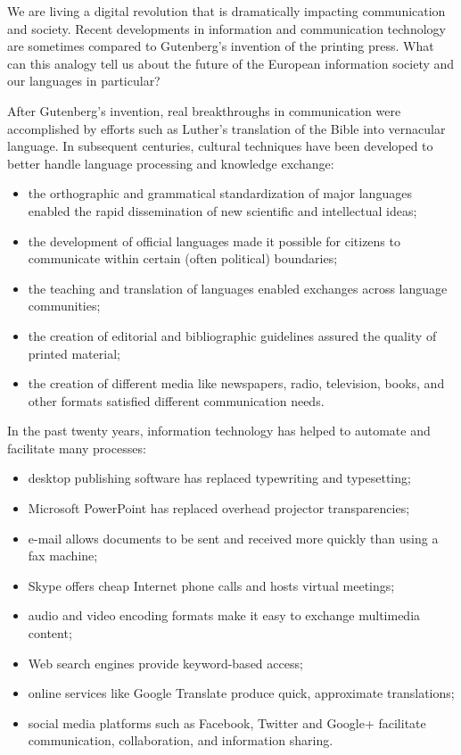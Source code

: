 \begin{multicols}{2}

We are living a digital revolution that is dramatically impacting communication and society. Recent developments in information and communication technology are sometimes compared to Gutenberg's invention of the printing press. What can this analogy tell us about the future of the European information society and our languages in particular?


After Gutenberg's invention, real breakthroughs in communication were accomplished by efforts such as Luther's translation of the Bible into vernacular language. In subsequent centuries, cultural techniques have been developed to better handle language processing and knowledge exchange:

\begin{itemize}
\item the orthographic and grammatical standardization of major languages enabled the rapid dissemination of new scientific and intellectual ideas;
\item the development of official languages made it possible for citizens to communicate within certain (often political) boundaries;
\item the teaching and translation of languages enabled exchanges across language communities;
\item the creation of editorial and bibliographic guidelines assured the quality of printed material;
\item the creation of different media like newspapers, radio, television, books, and other formats satisfied different communication needs. 
\end{itemize}

In the past twenty years, information technology has helped to automate and facilitate many processes:

\begin{itemize}
\item desktop publishing software has replaced typewriting and typesetting;
\item Microsoft PowerPoint has replaced overhead projector transparencies;
\item e-mail allows documents to be sent and received more quickly than using a fax machine;
\item Skype offers cheap Internet phone calls and hosts virtual meetings;
\item audio and video encoding formats make it easy to exchange multimedia content;
\item Web search engines provide keyword-based access;
\item online services like Google Translate produce quick, approximate translations;
\item social media platforms such as Facebook, Twitter and Google+ facilitate communication, collaboration, and information sharing.
\end{itemize}


\end{multicols}
